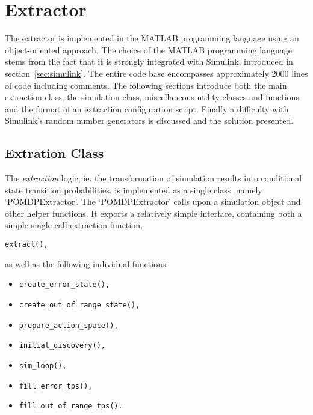 \section{Extractor}

The extractor is implemented in the MATLAB programming language using an object-oriented approach. The choice of the MATLAB programming language stems from the fact that it is strongly integrated with Simulink, introduced in section~\ref{sec:simulink}. The entire code base encompasses approximately 2000 lines of code including comments. The following sections introduce both the main extraction class, the simulation class, miscellaneous utility classes and functions and the format of an extraction configuration script. Finally a difficulty with Simulink's random number generators is discussed and the solution presented.

\subsection{Extration Class}

The \textit{extraction} logic, ie. the transformation of simulation results into conditional state transition probabilities, is implemented as a single class, namely `POMDPExtractor'. The `POMDPExtractor' calls upon a simulation object and other helper functions. It exports a relatively simple interface, containing both a simple single-call extraction function,
 \begin{verbatim}extract(),\end{verbatim}

 as well as the following individual functions:

\begin{itemize}
\item \begin{verbatim}create_error_state(),\end{verbatim}
\item \begin{verbatim}create_out_of_range_state(),\end{verbatim}
\item \begin{verbatim}prepare_action_space(),\end{verbatim}
\item \begin{verbatim}initial_discovery(),\end{verbatim}
\item \begin{verbatim}sim_loop(),\end{verbatim}
\item \begin{verbatim}fill_error_tps(),\end{verbatim}
\item \begin{verbatim}fill_out_of_range_tps().\end{verbatim}
\end{itemize}

